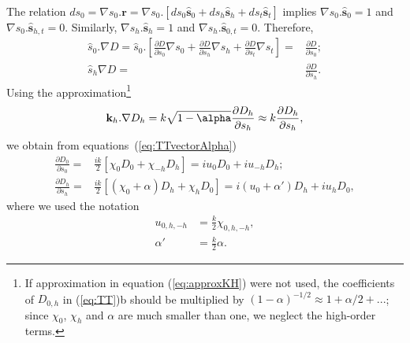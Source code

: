 \documentclass{iucr}
\begin{document}
The relation $d s_0 = \nabla s_0 . \textbf{r}= \nabla s_0 . [ d s_0 \hat{\textbf{s}}_0 + d s_h \hat{\textbf{s}}_h + d s_t \hat{\textbf{s}}_t ]$ implies $\nabla s_0 . \hat{\textbf{s}}_0=1$ and $\nabla s_0 . \hat{\textbf{s}}_{h,t}=0$. Similarly, $\nabla s_h . \hat{\textbf{s}}_h=1$ and $\nabla s_h . \hat{\textbf{s}}_{0,t}=0$. Therefore, 
\begin{subequations}
\label{eq:equalities}
\begin{align}
\hat s_0 . \nabla D=
\hat s_0 . \left[ 
\frac{\partial D}{\partial s_0} \nabla s_0 + 
\frac{\partial D}{\partial s_h} \nabla s_h +
\frac{\partial D}{\partial s_t} \nabla s_t
\right] 
=& \frac{\partial D}{\partial s_0}
; \\
\hat s_h \nabla D =& 
\frac{\partial D}{\partial s_h}.
\end{align}
\end{subequations}
Using the approximation\footnote{
If approximation in equation (\ref{eq:approxKH}) were not used, the coefficients of $D_{0,h}$ in (\ref{eq:TT})b should be multiplied by $(1-\alpha)^{-1/2} \approx 1 + \alpha/2 + ...$; since $\chi_0$, $\chi_h$ and $\alpha$ are much smaller than one, we neglect the high-order terms.
}
\begin{equation}\label{eq:approxKH}
\textbf k_h . \nabla D_h = 
k \sqrt{1-\alpha} \frac{\partial D_h}{\partial s_h}
\approx k \frac{\partial D_h}{ \partial s_h},
\end{equation}
we obtain from equations~(\ref{eq:TTvectorAlpha})
\begin{subequations}\label{eq:TT}
\begin{align}
\frac{\partial D_0}{\partial s_0} =& \frac{ik}{2} \left[ \chi_0 D_0+ \chi_{-h} D_h \right] = i u_0 D_0 + i u_{-h} D_h; \\
\frac{\partial D_h}{\partial s_h} =& \frac{ik}{2} \left[ (\chi_0 + \alpha) D_h+ \chi_{h} D_0 \right] = i (u_0 + \alpha') D_h + i u_h D_0,
\end{align}
\end{subequations}
where we used the notation 
\begin{subequations}
\label{eq:uandalphaprime}
\begin{align}
    u_{0,h,-h}&=\frac{k}{2} \chi_{0,h,-h},  \\
     \alpha'  &= \frac{k}{2}  \alpha.
\end{align}
\end{subequations}
\end{document}
